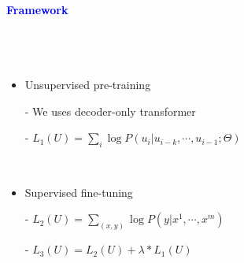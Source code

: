\documentclass[professionalfont]{beamer}
\begin{document}
\begin{frame}
\begin{refsection}

\begin{center}
    { \textbf{\textcolor{blue}{ {\fontsize{12}{14}\selectfont Framework} }} }
\end{center}
\\[0.2cm]

\begin{columns}
    {\fontsize{10}{14}\selectfont 
        \begin{itemize}
            \item Unsupervised pre-training
    
            - We uses decoder-only transformer \cite{transformer-dec}

            - \( L_1(U) = \sum_{i}\log{P(u_i|u_{i-k}, \cdots , u_{i-1};\Theta)} \)

            \\[1.0cm]
            
            \item Supervised fine-tuning
    
            - \( L_2(U) = \sum_{(x,y)}\log{P(y|x^1, \cdots , x^m)} \)

            - \( L_3(U) = L_2(U) + \lambda * L_1(U) \)


\end{itemize}}
\end{columns}
\end{refsection}
\end{frame}
\end{document}
